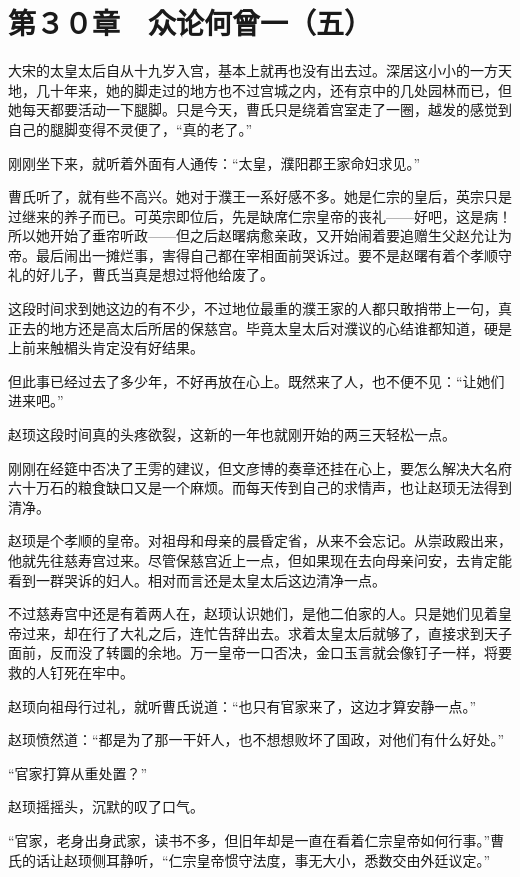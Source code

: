 \section{第３０章　众论何曾一（五）}

大宋的太皇太后自从十九岁入宫，基本上就再也没有出去过。深居这小小的一方天地，几十年来，她的脚走过的地方也不过宫城之内，还有京中的几处园林而已，但她每天都要活动一下腿脚。只是今天，曹氏只是绕着宫室走了一圈，越发的感觉到自己的腿脚变得不灵便了，“真的老了。”

刚刚坐下来，就听着外面有人通传：“太皇，濮阳郡王家命妇求见。”

曹氏听了，就有些不高兴。她对于濮王一系好感不多。她是仁宗的皇后，英宗只是过继来的养子而已。可英宗即位后，先是缺席仁宗皇帝的丧礼——好吧，这是病！所以她开始了垂帘听政——但之后赵曙病愈亲政，又开始闹着要追赠生父赵允让为帝。最后闹出一摊烂事，害得自己都在宰相面前哭诉过。要不是赵曙有着个孝顺守礼的好儿子，曹氏当真是想过将他给废了。

这段时间求到她这边的有不少，不过地位最重的濮王家的人都只敢捎带上一句，真正去的地方还是高太后所居的保慈宫。毕竟太皇太后对濮议的心结谁都知道，硬是上前来触楣头肯定没有好结果。

但此事已经过去了多少年，不好再放在心上。既然来了人，也不便不见：“让她们进来吧。”

赵顼这段时间真的头疼欲裂，这新的一年也就刚开始的两三天轻松一点。

刚刚在经筵中否决了王雱的建议，但文彦博的奏章还挂在心上，要怎么解决大名府六十万石的粮食缺口又是一个麻烦。而每天传到自己的求情声，也让赵顼无法得到清净。

赵顼是个孝顺的皇帝。对祖母和母亲的晨昏定省，从来不会忘记。从崇政殿出来，他就先往慈寿宫过来。尽管保慈宫近上一点，但如果现在去向母亲问安，去肯定能看到一群哭诉的妇人。相对而言还是太皇太后这边清净一点。

不过慈寿宫中还是有着两人在，赵顼认识她们，是他二伯家的人。只是她们见着皇帝过来，却在行了大礼之后，连忙告辞出去。求着太皇太后就够了，直接求到天子面前，反而没了转圜的余地。万一皇帝一口否决，金口玉言就会像钉子一样，将要救的人钉死在牢中。

赵顼向祖母行过礼，就听曹氏说道：“也只有官家来了，这边才算安静一点。”

赵顼愤然道：“都是为了那一干奸人，也不想想败坏了国政，对他们有什么好处。”

“官家打算从重处置？”

赵顼摇摇头，沉默的叹了口气。

“官家，老身出身武家，读书不多，但旧年却是一直在看着仁宗皇帝如何行事。”曹氏的话让赵顼侧耳静听，“仁宗皇帝惯守法度，事无大小，悉数交由外廷议定。”

